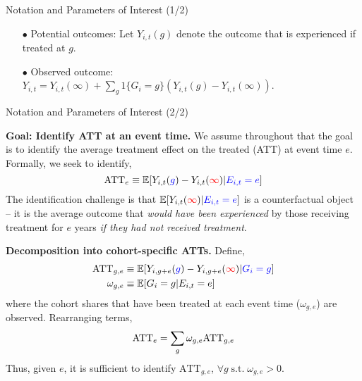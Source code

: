 \documentclass[usenames,dvipsnames]{beamer}
\begin{document}
\begin{frame}{Notation and Parameters of Interest (1/2)}
\begin{itemize}
\vspace{0.1cm}
\item[$\bullet$] Potential outcomes: Let $Y_{i,t}(g)$ denote the outcome that is experienced if treated at $g$.

\vspace{0.1cm}
\item[$\bullet$] Observed outcome: $Y_{i,t} =   Y_{i,t}(\infty) + \sum_{g} 1\{G_i=g\} (Y_{i,t}(g) - Y_{i,t}(\infty))$.
\end{itemize}
 
\vspace{-0.05cm}

\end{frame}


\begin{frame}{Notation and Parameters of Interest (2/2)}

\textbf{Goal: Identify ATT at an event time.} We assume throughout that the goal is to identify the average treatment effect on the treated (ATT) at event time $e$. Formally, we seek to identify,
\begin{equation} \notag
\textrm{ATT}_{e} \equiv   \mathbb{E}[Y_{i,t}({\color{blue} g}) - Y_{i,t}({\color{red} \infty}) | {\color{blue}E_{i,t}=e}]  
\end{equation}
The identification challenge is that $\mathbb{E}[ Y_{i,t}({\color{red}\infty}) | {\color{blue}E_{i,t}=e}] $ is a counterfactual object -- it is the average outcome that \textit{would have been experienced} by those receiving treatment for $e$ years  \textit{if they had not received treatment}.
 

\textbf{Decomposition into cohort-specific ATTs.} Define,
\begin{equation} \notag
\begin{aligned}
\textrm{ATT}_{g,e} & \equiv   \mathbb{E}[Y_{i,g+e}({\color{blue} g})- Y_{i,g+e}({\color{red}\infty}) | {\color{blue}G_i = g}]  \\
\omega_{g,e} & \equiv \mathbb{E}[G_i=g | E_{i,t}=e]
\end{aligned}
\end{equation}
where the cohort shares that have been treated at each event time ($\omega_{g,e}$) are observed. Rearranging terms,  
\begin{equation} \notag
\textrm{ATT}_{e} =  \sum_{g} \omega_{g,e} \textrm{ATT}_{g,e}
\end{equation}
Thus, given $e$, it is sufficient to identify  $\textrm{ATT}_{g,e}$, $\forall g \; \text{s.t.} \; \omega_{g,e}>0$.

\end{frame}
\end{document}
